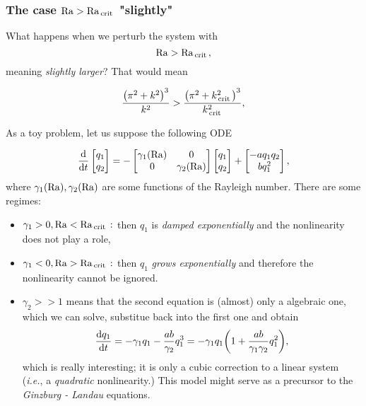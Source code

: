 \documentclass[../main.tex]{subfiles}
\begin{document}
\subsubsection{The case $\mathrm{Ra} > \mathrm{Ra}_{\, \text{crit} \,}$ "slightly"}
\label{sec:r>r_crit}

What happens when we perturb the system with
\[
	\mathrm{Ra} > \mathrm{Ra}_{\, \text{crit} \,},
\]
meaning \textit{slightly larger}? That would mean

\[
	\frac{\qty(\pi^{2}+k^{2})^{3}}{k^{2}}>\frac{\qty(\pi^{2}+k_{\, \text{crit} \,}^{2})^{3}}{k_{\, \text{crit} \,}^{2}},
\]


As a toy problem, let us suppose the following ODE

\[
	\dv{t} \begin{bmatrix}
		q_1 \\
		q_2
	\end{bmatrix}
	= - \begin{bmatrix}
		\gamma_1\qty(\mathrm{Ra}) & 0 \\
		0 & \gamma_2\qty(\mathrm{Ra})
	\end{bmatrix}
	\begin{bmatrix}
		q_1 \\
		q_2
	\end{bmatrix}
	+
	\begin{bmatrix}
		-a q_1 q_2 \\
		b q_1^{2}
	\end{bmatrix},
\]
where $\gamma_1\qty(\mathrm{Ra}), \gamma_2\qty(\mathrm{Ra})$ are some functions of the Rayleigh number. There are some regimes:

\begin{itemize}
	\item $\gamma_1>0, \mathrm{Ra} < \mathrm{Ra}_{\, \text{crit} \,}:$ then $q_1$ is \textit{damped exponentially} and the nonlinearity does not play a role,
	\item $\gamma_1<0, \mathrm{Ra} > \mathrm{Ra}_{\, \text{crit} \,}:$ then $q_1$ \textit{grows exponentially} and therefore the nonlinearity cannot be ignored.
	\item $\gamma_2 >>1$ means that the second equation is (almost) only a algebraic one, which we can solve, substitue back into the first one and obtain
		\[
			\dv{q_1}{t} = -\gamma_1 q_1 - \frac{ab}{\gamma_2}q_1^{3} = -\gamma_1 q_1\qty(1+\frac{ab}{\gamma_1\gamma_2}q_1^{2}),
		\]
		which is really interesting; it is only a cubic correction to a linear system (\textit{i.e.}, a \textit{quadratic} nonlinearity.) This model might serve as a precursor to the \textit{Ginzburg - Landau} equations.
\end{itemize}
\end{document}
